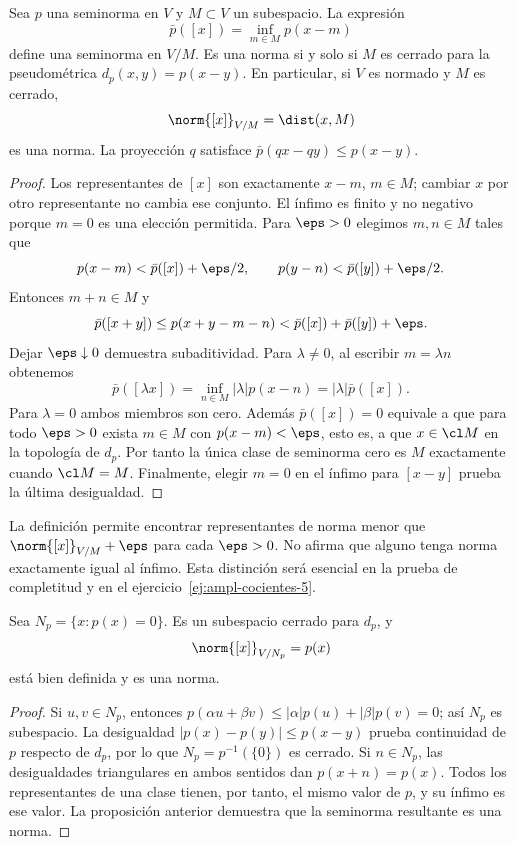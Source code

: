 \begin{proposicion}\label{ampl:cociente-seminorma}
Sea $p$ una seminorma en $V$ y $M\subset V$ un subespacio. La expresión
\[
 \bar p([x])=\inf_{m\in M}p(x-m)
\]
define una seminorma en $V/M$. Es una norma si y solo si $M$ es cerrado para la pseudométrica $d_p(x,y)=p(x-y)$. En particular, si $V$ es normado y $M$ es cerrado,
\[
 \norm{[x]}_{V/M}=\dist(x,M)
\]
es una norma. La proyección $q$ satisface $\bar p(qx-qy)\le p(x-y)$.
\end{proposicion}
\begin{proof}
Los representantes de $[x]$ son exactamente $x-m$, $m\in M$; cambiar $x$ por otro representante no cambia ese conjunto. El ínfimo es finito y no negativo porque $m=0$ es una elección permitida. Para $\eps>0$ elegimos $m,n\in M$ tales que
\[
 p(x-m)<\bar p([x])+\eps/2,\qquad
 p(y-n)<\bar p([y])+\eps/2.
\]
Entonces $m+n\in M$ y
\[
 \bar p([x+y])\le p(x+y-m-n)
 <\bar p([x])+\bar p([y])+\eps.
\]
Dejar $\eps\downarrow0$ demuestra subaditividad. Para $\lambda\ne0$, al escribir $m=\lambda n$ obtenemos
\[
 \bar p([\lambda x])=\inf_{n\in M}|\lambda|p(x-n)
 =|\lambda|\bar p([x]).
\]
Para $\lambda=0$ ambos miembros son cero. Además $\bar p([x])=0$ equivale a que para todo $\eps>0$ exista $m\in M$ con $p(x-m)<\eps$, esto es, a que $x\in\cl M$ en la topología de $d_p$. Por tanto la única clase de seminorma cero es $M$ exactamente cuando $\cl M=M$. Finalmente, elegir $m=0$ en el ínfimo para $[x-y]$ prueba la última desigualdad.
\end{proof}

\begin{observacion}
La definición permite encontrar representantes de norma menor que $\norm{[x]}_{V/M}+\eps$ para cada $\eps>0$. No afirma que alguno tenga norma exactamente igual al ínfimo. Esta distinción será esencial en la prueba de completitud y en el ejercicio~\ref{ej:ampl-cocientes-5}.
\end{observacion}

\begin{proposicion}\label{ampl:nucleo-seminorma}
Sea $N_p=\{x:p(x)=0\}$. Es un subespacio cerrado para $d_p$, y
\[
 \norm{[x]}_{V/N_p}=p(x)
\]
está bien definida y es una norma.
\end{proposicion}
\begin{proof}
Si $u,v\in N_p$, entonces $p(\alpha u+\beta v)\le|\alpha|p(u)+|\beta|p(v)=0$; así $N_p$ es subespacio. La desigualdad $|p(x)-p(y)|\le p(x-y)$ prueba continuidad de $p$ respecto de $d_p$, por lo que $N_p=p^{-1}(\{0\})$ es cerrado. Si $n\in N_p$, las desigualdades triangulares en ambos sentidos dan $p(x+n)=p(x)$. Todos los representantes de una clase tienen, por tanto, el mismo valor de $p$, y su ínfimo es ese valor. La proposición anterior demuestra que la seminorma resultante es una norma.
\end{proof}


